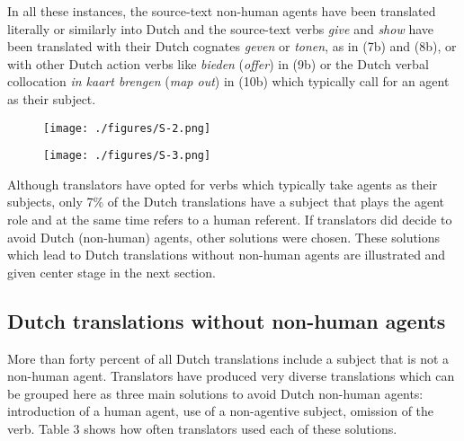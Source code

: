 \documentclass[output=paper]{LSP/langsci}
\begin{document}
In all these instances, the source-text non-human agents have been translated literally or similarly into Dutch and the source-text verbs \textit{give} and \textit{show} have been translated with their Dutch cognates \textit{geven} or \textit{tonen}, as in (7b) and (8b), or with other Dutch action verbs like \textit{bieden} (\textit{offer}) in (9b) or the Dutch verbal collocation \textit{in kaart brengen} (\textit{map out}) in (10b) which typically call for an agent as their subject.      

\begin{figure}
\texttt{[image: ./figures/S-2.png]}
\end{figure}

\begin{figure}
\texttt{[image: ./figures/S-3.png]}
\end{figure}

Although translators have opted for verbs which typically take agents as their subjects, only 7\% of the Dutch translations have a subject that plays the agent role and at the same time refers to a human referent. If translators did decide to avoid Dutch (non-human) agents, other solutions were chosen. These solutions which lead to Dutch translations without non-human agents are illustrated and given center stage in the next section.  

\subsection{Dutch translations without non-human agents}
More than forty percent of all Dutch translations include a subject that is not a non-human agent. Translators have produced very diverse translations which can be grouped here as three main solutions to avoid Dutch non-human agents: introduction of a human agent, use of a non-agentive subject, omission of the verb. Table 3 shows how often translators used each of these solutions. 
\end{document}

